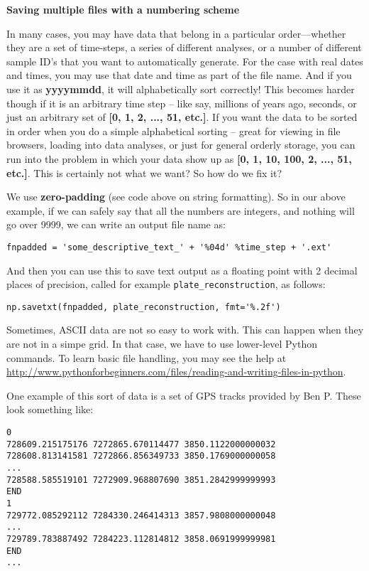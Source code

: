 \documentclass[a4paper,10pt]{scrartcl}
\begin{document}


\begin{framed}
\noindent\textbf{Saving multiple files with a numbering scheme}

In many cases, you may have data that belong in a particular order---whether they are a set of time-steps, a series of different analyses, or a number of different sample ID's that you want to automatically generate. For the case with real dates and times, you may use that date and time as part of the file name. And if you use it as \textbf{yyyymmdd}, it will alphabetically sort correctly! This becomes harder though if it is an arbitrary time step -- like say, millions of years ago, seconds, or just an arbitrary set of \textbf{[0, 1, 2, ..., 51, etc.]}. If you want the data to be sorted in order when you do a simple alphabetical sorting -- great for viewing in file browsers, loading into data analyses, or just for general orderly storage, you can run into the problem in which your data show up as \textbf{[0, 1, 10, 100, 2, ..., 51, etc.]}. This is certainly not what we want? So how do we fix it?

We use \textbf{zero-padding} (see code above on string formatting). So in our above example, if we can safely say that all the numbers are integers, and nothing will go over 9999, we can write an output file name as:

\lstinline{fnpadded = 'some_descriptive_text_' + '%04d' %time_step + '.ext'}

And then you can use this to save text output as a floating point with 2 decimal places of precision, called for example \lstinline{plate_reconstruction}, as follows:

\lstinline{np.savetxt(fnpadded, plate_reconstruction, fmt='%.2f')}

\end{framed}

Sometimes, ASCII data are not so easy to work with. This can happen when they are not in a simpe grid. In that case, we have to use lower-level Python commands. To learn basic file handling, you may see the help at \url{http://www.pythonforbeginners.com/files/reading-and-writing-files-in-python}.

One example of this sort of data is a set of GPS tracks provided by Ben P. These look something like:

\begin{lstlisting}
0
728609.215175176 7272865.670114477 3850.1122000000032
728608.813141581 7272866.856349733 3850.1769000000058
...
728588.585519101 7272909.968807690 3851.2842999999993
END
1
729772.085292112 7284330.246414313 3857.9808000000048
...
729789.783887492 7284223.112814812 3858.0691999999981
END
...
\end{lstlisting}
\end{document}
